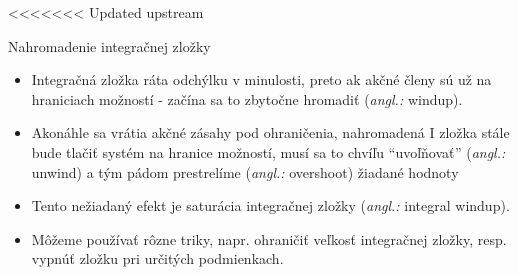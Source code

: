 \documentclass{beamer}
\newcommand{\angl}[1]{{\color{gray}(\emph{angl.:} #1)}}
\begin{document}
<<<<<<< Updated upstream
\begin{frame}[t]{Nahromadenie integračnej zložky}
  \begin{itemize}
    \item<1-> Integračná zložka ráta odchýlku v minulosti, preto ak akčné členy sú už na hraniciach možností - začína sa to zbytočne hromadiť \angl{windup}.
    \item<2-> Akonáhle sa vrátia akčné zásahy pod ohraničenia, nahromadená I zložka stále bude tlačiť systém na hranice možností, musí sa to chvíľu ``uvoľňovať'' \angl{unwind} a tým pádom prestrelíme \angl{overshoot} žiadané hodnoty
    \item<3-> Tento nežiadaný efekt je saturácia integračnej zložky \angl{integral windup}.
    \item<4-> Môžeme používať rôzne triky, napr. ohraničiť veľkosť integračnej zložky, resp. vypnúť zložku pri určitých podmienkach.
  \end{itemize}
\end{frame}
\end{document}
